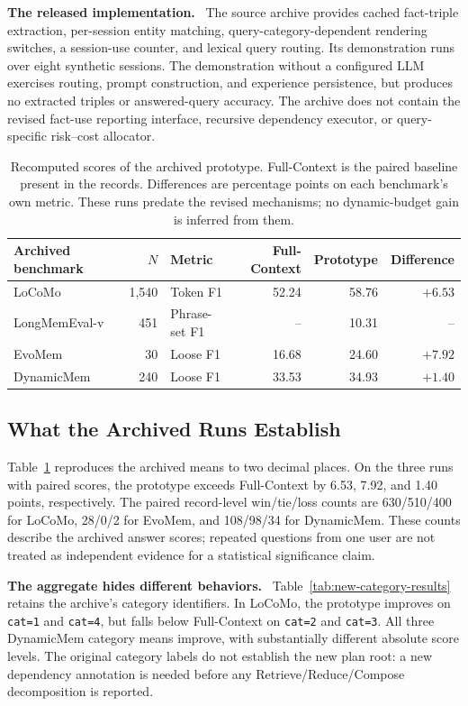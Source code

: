 \documentclass[10pt,twocolumn]{article}
\newcommand{\runin}[1]{\smallskip\noindent\textbf{#1.}\ }
\begin{document}
\runin{The released implementation}
The source archive provides cached fact-triple extraction, per-session
entity matching, query-category-dependent rendering switches, a
session-use counter, and lexical query routing. Its demonstration runs
over eight synthetic sessions. The demonstration without a configured
LLM exercises routing, prompt construction, and experience persistence,
but produces no extracted triples or answered-query accuracy. The
archive does not contain the revised fact-use reporting interface,
recursive dependency executor, or query-specific risk--cost allocator.

\begin{table}[t]
\centering\small
\caption{Recomputed scores of the archived prototype. Full-Context is
the paired baseline present in the records. Differences are percentage
points on each benchmark's own metric. These runs predate the revised
mechanisms; no dynamic-budget gain is inferred from them.}
\label{tab:new-archived-results}
\begin{tabular}{@{}lrlrrr@{}}
\toprule
Archived benchmark & $N$ & Metric & Full-Context & Prototype & Difference\\
\midrule
LoCoMo & 1,540 & Token F1 & 52.24 & 58.76 & $+6.53$\\
LongMemEval-v & 451 & Phrase-set F1 & -- & 10.31 & --\\
EvoMem & 30 & Loose F1 & 16.68 & 24.60 & $+7.92$\\
DynamicMem & 240 & Loose F1 & 33.53 & 34.93 & $+1.40$\\
\bottomrule
\end{tabular}
\end{table}

\subsection{What the Archived Runs Establish}
\label{subsec:new-archive-results}

Table~\ref{tab:new-archived-results} reproduces the archived means to
two decimal places. On the three runs with paired scores, the prototype
exceeds Full-Context by 6.53, 7.92, and 1.40 points, respectively.
The paired record-level win/tie/loss counts are 630/510/400 for LoCoMo,
28/0/2 for EvoMem, and 108/98/34 for DynamicMem. These counts describe
the archived answer scores; repeated questions from one user are not
treated as independent evidence for a statistical significance claim.

\runin{The aggregate hides different behaviors}
Table~\ref{tab:new-category-results} retains the archive's category
identifiers. In LoCoMo, the prototype improves on \texttt{cat=1} and
\texttt{cat=4}, but falls below Full-Context on \texttt{cat=2} and
\texttt{cat=3}. All three DynamicMem category means improve, with
substantially different absolute score levels. The original category
labels do not establish the new plan root: a new dependency annotation
is needed before any Retrieve/Reduce/Compose decomposition is reported.
\end{document}
